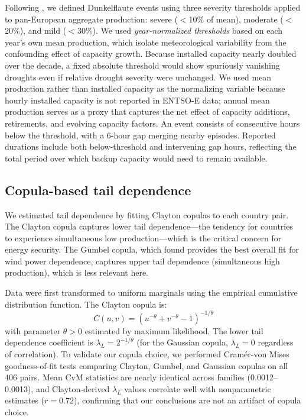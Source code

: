 \documentclass{article}
\begin{document}
Following \citet{kittel2026}, we defined Dunkelflaute events using three severity thresholds applied to pan-European aggregate production: severe ($<$10\% of mean), moderate ($<$20\%), and mild ($<$30\%). We used \textit{year-normalized thresholds} based on each year's own mean production, which isolate meteorological variability from the confounding effect of capacity growth. Because installed capacity nearly doubled over the decade, a fixed absolute threshold would show spuriously vanishing droughts even if relative drought severity were unchanged. We used mean production rather than installed capacity as the normalizing variable because hourly installed capacity is not reported in ENTSO-E data; annual mean production serves as a proxy that captures the net effect of capacity additions, retirements, and evolving capacity factors. An event consists of consecutive hours below the threshold, with a 6-hour gap merging nearby episodes. Reported durations include both below-threshold and intervening gap hours, reflecting the total period over which backup capacity would need to remain available.

\subsection{Copula-based tail dependence}

We estimated tail dependence by fitting Clayton copulas to each country pair. The Clayton copula captures lower tail dependence---the tendency for countries to experience simultaneous low production---which is the critical concern for energy security. The Gumbel copula, which \citet{louie2014} found provides the best overall fit for wind power dependence, captures upper tail dependence (simultaneous high production), which is less relevant here.

Data were first transformed to uniform marginals using the empirical cumulative distribution function. The Clayton copula is:
\begin{equation}
    C(u,v) = (u^{-\theta} + v^{-\theta} - 1)^{-1/\theta}
\end{equation}
with parameter $\theta > 0$ estimated by maximum likelihood. The lower tail dependence coefficient is $\lambda_L = 2^{-1/\theta}$ (for the Gaussian copula, $\lambda_L = 0$ regardless of correlation). To validate our copula choice, we performed Cram\'er-von Mises goodness-of-fit tests comparing Clayton, Gumbel, and Gaussian copulas on all 406 pairs. Mean CvM statistics are nearly identical across families (0.0012--0.0013), and Clayton-derived $\lambda_L$ values correlate well with nonparametric estimates ($r = 0.72$), confirming that our conclusions are not an artifact of copula choice.
\end{document}
